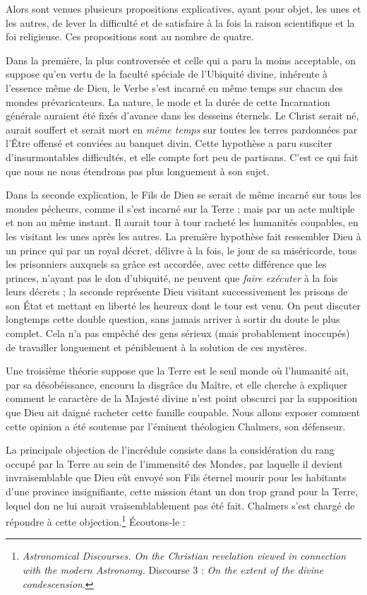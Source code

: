 \documentclass[a4paper, 11pt, oneside]{article}
\begin{document}
Alors sont venues plusieurs propositions explicatives, ayant pour objet, les unes et les autres, de lever la difficulté et de satisfaire à la fois la raison scientifique et la foi religieuse. Ces propositions sont au nombre de quatre.

Dans la première, la plus controversée et celle qui a paru la moins acceptable, on suppose qu'en vertu de la faculté spéciale de l'Ubiquité divine, inhérente à l'essence même de Dieu, le Verbe s'est incarné en même temps sur chacun des mondes prévaricateurs. La nature, le mode et la durée de cette Incarnation générale auraient été fixés d'avance dans les desseins éternels. Le Christ serait né, aurait souffert et serait mort en \emph{même temps} sur toutes les terres pardonnées par l'Être offensé et conviées au banquet divin. Cette hypothèse a paru susciter d'insurmontables difficultés, et elle compte fort peu de partisans. C'est ce qui fait que nous ne nous étendrons pas plus longuement à son sujet.

Dans la seconde explication, le Fils de Dieu se serait de même incarné sur tous les mondes pécheurs, comme il s'est incarné sur la Terre ; mais par un acte multiple et non au même instant. Il aurait tour à tour racheté les humanités coupables, en les visitant les unes après les autres. La première hypothèse fait ressembler Dieu à un prince qui par un royal décret, délivre à la fois, le jour de sa miséricorde, tous les prisonniers auxquels sa grâce est accordée, avec cette différence que les princes, n'ayant pas le don d'ubiquité, ne peuvent que \emph{faire exécuter} à la fois leurs décrets ; la seconde représente Dieu visitant successivement les prisons de son État et mettant en liberté les heureux dont le tour est venu. On peut discuter longtemps cette double question, sans jamais arriver à sortir du doute le plus complet. Cela n'a pas empêché des gens sérieux (mais probablement inoccupés) de travailler longuement et péniblement à la solution de ces mystères.

Une troisième théorie suppose que la Terre est le seul monde où l'humanité ait, par sa désobéissance, encouru la disgrâce du Maître, et elle cherche à expliquer comment le caractère de la Majesté divine n'est point obscurci par la supposition que Dieu ait daigné racheter cette famille coupable. Nous allons exposer comment cette opinion a été soutenue par l'éminent théologien Chalmers, son défenseur.

La principale objection de l'incrédule consiste dans la considération du rang occupé par la Terre au sein de l'immensité des Mondes, par laquelle il devient invraisemblable que Dieu eût envoyé son Fils éternel mourir pour les habitants d'une province insignifiante, cette mission étant un don trop grand pour la Terre, lequel don ne lui aurait vraisemblablement pas été fait. Chalmers s'est chargé de répondre à cette objection.\footnote{\emph{Astronomical Discourses. On the Christian revelation viewed in connection with the modern Astronomy.} Discourse 3 : \emph{On the extent of the divine condescension}.} Écoutons-le :
\end{document}
